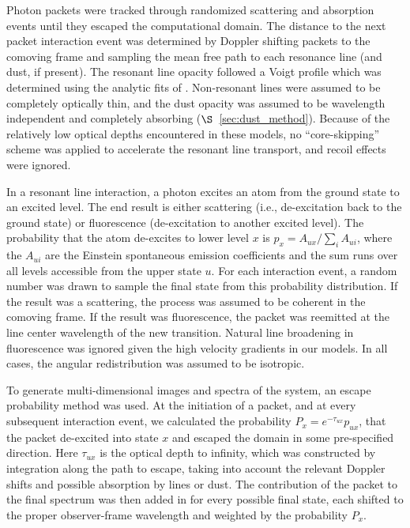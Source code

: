 \documentclass[12pt,preprint]{aastex}
\begin{document}
Photon packets were tracked through randomized scattering and
absorption events until they escaped the computational domain.  The
distance to the next packet interaction event was determined by
Doppler shifting packets to the comoving frame and sampling the mean
free path to each resonance line (and dust, if present).  The resonant
line opacity followed a Voigt profile which was determined using the
analytic fits of  \cite{Tomi_2006}.      Non-resonant lines were
assumed to be completely optically thin, and the dust opacity was
assumed to be wavelength independent and completely absorbing
($\S$~\ref{sec:dust_method}).
Because of the relatively low optical depths encountered in
these models, no ``core-skipping'' scheme was applied to accelerate
the resonant line transport,  and recoil effects were ignored. 

In a resonant line interaction, a photon excites an atom from the ground state to an excited level.  The end result is either scattering (i.e., de-excitation back to the ground state) or fluorescence (de-excitation to another excited  level).  The probability that the atom de-excites to lower level $x$ is  $p_{x} = A_{ux} / \sum_i A_{ui}$, where the $A_{ui}$ are the Einstein spontaneous emission coefficients and the sum runs over all levels accessible from the upper state $u$.  
For each interaction event, a random number was drawn to sample the final state from this probability distribution.    If the result was a scattering, the process was assumed to be coherent in the comoving frame.  If the result was fluorescence, the packet was  reemitted at the line center wavelength of the new transition.  Natural line broadening in fluorescence was ignored given the high velocity gradients in our models.  In all cases, the angular redistribution was  assumed to be isotropic.

To generate multi-dimensional images and spectra of the system, an escape probability method was used.  At the initiation of a packet, and at every subsequent interaction event, we calculated the probability $P_x = e^{-\tau_{ux}} p_{ux}$,  that the packet de-excited into state $x$ and escaped the domain in some pre-specified direction. Here
$\tau_{ux}$ is the optical depth to infinity, which was  constructed  by integration along the path to escape, taking into account the relevant Doppler shifts and possible absorption by lines or dust.  The contribution of the packet to the final spectrum was then added in for every possible final state, each shifted to the proper observer-frame wavelength and weighted by the probability $P_x$.
\end{document}

